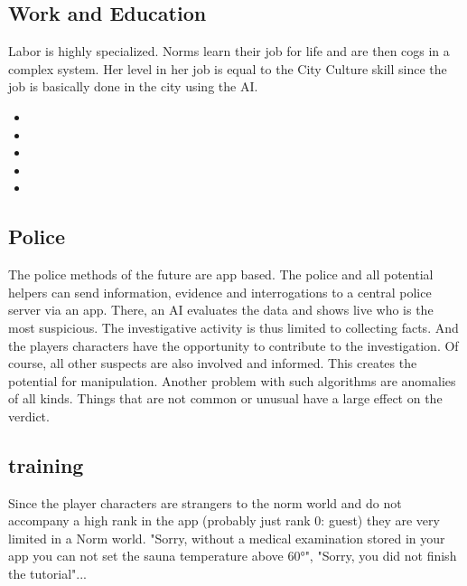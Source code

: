 \subsection{Work and Education}
Labor is highly specialized. Norms learn their job for life and are then cogs in a complex system. Her level in her job is equal to the City Culture skill since the job is basically done in the city using the AI.
\begin{normtalk}[title=An example from the life of a Level 3 Architect.]
    \begin{itemize}
        \item {}
        \item {}
        \item {}
        \item {}
        \item {}
    \end{itemize}
\end{normtalk}

\subsection{Police}
The police methods of the future are app based. The police and all potential helpers can send information, evidence and interrogations to a central police server via an app. There, an AI evaluates the data and shows live who is the most suspicious. The investigative activity is thus limited to collecting facts. And the players characters have the opportunity to contribute to the investigation. Of course, all other suspects are also involved and informed. This creates the potential for manipulation. Another problem with such algorithms are anomalies of all kinds. Things that are not common or unusual have a large effect on the verdict.

\subsection{training}

Since the player characters are strangers to the norm world and do not accompany a high rank in the app (probably just rank 0: guest) they are very limited in a Norm world. "Sorry, without a medical examination stored in your app you can not set the sauna temperature above 60°", "Sorry, you did not finish the tutorial"...